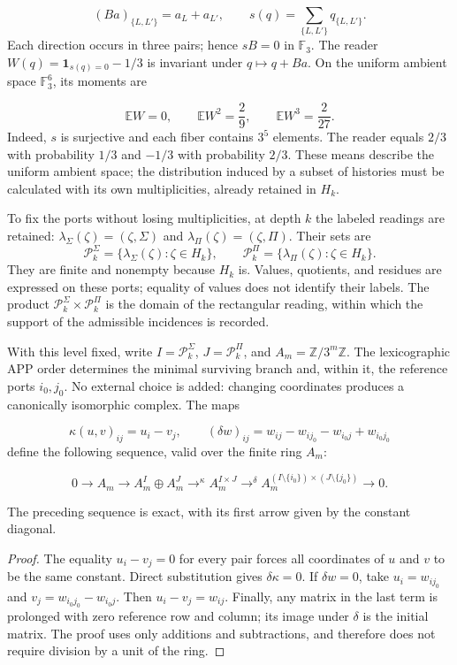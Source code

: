 \[
(Ba)_{\{L,L'\}}=a_L+a_{L'},
\qquad
s(q)=\sum_{\{L,L'\}}q_{\{L,L'\}}.
\]
Each direction occurs in three pairs; hence \(sB=0\) in \(\mathbb F_3\). The reader \(W(q)=\mathbf1_{s(q)=0}-1/3\) is invariant under \(q\mapsto q+Ba\). On the uniform ambient space \(\mathbb F_3^6\), its moments are

\[
\mathbb EW=0,\qquad
\mathbb EW^2=\frac29,\qquad
\mathbb EW^3=\frac2{27}.
\]
Indeed, \(s\) is surjective and each fiber contains \(3^5\) elements. The reader equals \(2/3\) with probability \(1/3\) and \(-1/3\) with probability \(2/3\). These means describe the uniform ambient space; the distribution induced by a subset of histories must be calculated with its own multiplicities, already retained in \(H_k\).

To fix the ports without losing multiplicities, at depth \(k\) the
labeled readings are retained:
\(\lambda_\Sigma(\zeta)=(\zeta,\Sigma)\) and
\(\lambda_\Pi(\zeta)=(\zeta,\Pi)\). Their sets are
\[
\mathscr P_k^\Sigma=\{\lambda_\Sigma(\zeta):\zeta\in H_k\},\qquad
\mathscr P_k^\Pi=\{\lambda_\Pi(\zeta):\zeta\in H_k\}.
\]
They are finite and nonempty because \(H_k\) is. Values, quotients, and residues
are expressed on these ports; equality of values does not identify their
labels. The product \(\mathscr P_k^\Sigma\times\mathscr P_k^\Pi\) is the
domain of the rectangular reading, within which the support of the
admissible incidences is recorded.

With this level fixed, write \(I=\mathscr P_k^\Sigma\),
\(J=\mathscr P_k^\Pi\), and \(A_m=\mathbb Z/3^m\mathbb Z\). The
lexicographic APP order determines the minimal surviving branch and, within it, the
reference ports \(i_0,j_0\). No external choice is added: changing
coordinates produces a canonically isomorphic complex. The maps

\[
\kappa(u,v)_{ij}=u_i-v_j,
\qquad
(\delta w)_{ij}=w_{ij}-w_{ij_0}-w_{i_0j}+w_{i_0j_0}
\]
define the following sequence, valid over the finite ring \(A_m\):

\[
0\longrightarrow A_m\longrightarrow
A_m^I\oplus A_m^J\mathrel{\mathop{\longrightarrow}^{\kappa}}
A_m^{I\times J}\mathrel{\mathop{\longrightarrow}^{\delta}}
A_m^{(I\setminus\{i_0\})\times(J\setminus\{j_0\})}
\longrightarrow0.
\]
\begin{proposition}
\label{prop:continuo-exactitud-rectangular}
The preceding sequence is exact, with its first arrow given by the constant diagonal.
\end{proposition}
\begin{proof}
The equality \(u_i-v_j=0\) for every pair forces all coordinates of \(u\) and \(v\) to be the same constant. Direct substitution gives \(\delta\kappa=0\). If \(\delta w=0\), take \(u_i=w_{ij_0}\) and \(v_j=w_{i_0j_0}-w_{i_0j}\). Then \(u_i-v_j=w_{ij}\). Finally, any matrix in the last term is prolonged with zero reference row and column; its image under \(\delta\) is the initial matrix. The proof uses only additions and subtractions, and therefore does not require division by a unit of the ring.
\end{proof}

